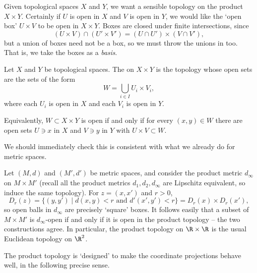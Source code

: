 Given topological spaces $X$ and $Y$, we want a sensible topology on the product $X \times Y$. Certainly if $U$ is open in $X$ and $V$ is open in $Y$, we would like the `open box' $U \times V$ to be open in $X \times Y$. Boxes are closed under finite intersections, since
$$
(U \times V) \cap (U' \times V') = (U \cap U') \times (V \cap V'),
$$
but a union of boxes need not be a box, so we must throw the unions in too. That is, we take the boxes as a \emph{basis}.

\begin{definition}
    Let $X$ and $Y$ be topological spaces. The  on $X \times Y$ is the topology whose open sets are the sets of the form
    $$
    W = \bigcup_{i \in I} U_i \times V_i,
    $$
    where each $U_i$ is open in $X$ and each $V_i$ is open in $Y$.
\end{definition}

Equivalently, $W \subset X \times Y$ is open if and only if for every $(x, y) \in W$ there are open sets $U \ni x$ in $X$ and $V \ni y$ in $Y$ with $U \times V \subset W$.

We should immediately check this is consistent with what we already do for metric spaces.

\begin{example}
    Let $(M, d)$ and $(M', d')$ be metric spaces, and consider the product metric $d_{\infty}$ on $M \times M'$ (recall all the product metrics $d_1, d_2, d_{\infty}$ are Lipschitz equivalent, so induce the same topology). For $z = (x, x')$ and $r > 0$,
    $$
    D_r(z) = \{(y, y') \mid d(x, y) < r \text{ and } d'(x', y') < r\} = D_r(x) \times D_r(x'),
    $$
    so open balls in $d_\infty$ are precisely `square' boxes. It follows easily that a subset of $M \times M'$ is $d_{\infty}$-open if and only if it is open in the product topology -- the two constructions agree. In particular, the product topology on $\R \times \R$ is the usual Euclidean topology on $\R^2$.
\end{example}

The product topology is `designed' to make the coordinate projections behave well, in the following precise sense.

